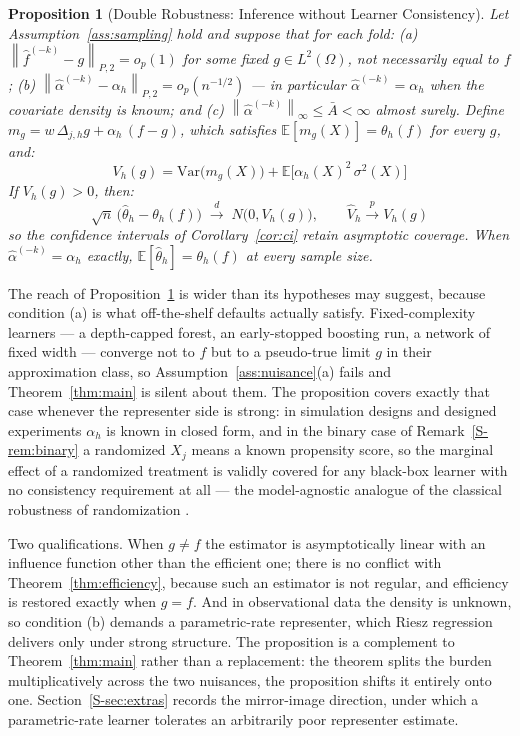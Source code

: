 \documentclass[12pt,a4paper]{article}
\numberwithin{equation}{section}
\theoremstyle{plain}
\newtheorem{proposition}{Proposition}
\theoremstyle{definition}
\newcommand{\norm}[1]{\left\| #1 \right\|}
\newcommand{\E}{\mathbb{E}}
\newcommand{\xrightarrowp}{\xrightarrow{p}}
\newcommand{\Dh}{\Delta_{j,h}}
\newcommand{\Ptwo}[1]{\norm{#1}_{P,2}}
\begin{document}
	\begin{proposition}[Double Robustness: Inference without Learner Consistency]
		\label{prop:robust}
		Let Assumption~\ref{ass:sampling} hold and suppose that for each fold:
		(a) $\Ptwo{\hat{f}^{(-k)} - g} = o_p(1)$ for some fixed $g \in L^2(\Omega)$,
		\emph{not necessarily equal to $f$};
		(b) $\Ptwo{\hat{\alpha}^{(-k)} - \alpha_h} = o_p(n^{-1/2})$ --- in particular
		$\hat{\alpha}^{(-k)} = \alpha_h$ when the covariate density is known; and
		(c) $\norm{\hat{\alpha}^{(-k)}}_\infty \leq \bar{A} < \infty$ almost surely.
		Define $m_g = w\, \Dh g + \alpha_h\,(f - g)$, which satisfies
		$\E[m_g(X)] = \theta_h(f)$ for every $g$, and:
		\begin{equation}
			V_h(g) = \mathrm{Var}\bigl(m_g(X)\bigr)
			+ \E\bigl[\alpha_h(X)^2\, \sigma^2(X)\bigr]
			\label{eq:vrobust}
		\end{equation}
		If $V_h(g) > 0$, then:
		\begin{equation}
			\sqrt{n}\,\bigl(\hat{\theta}_h - \theta_h(f)\bigr)
			\;\xrightarrow{d}\; N\bigl(0, V_h(g)\bigr),
			\qquad
			\hat{V}_h \xrightarrowp V_h(g)
		\end{equation}
		so the confidence intervals of Corollary~\ref{cor:ci} retain asymptotic
		coverage. When $\hat{\alpha}^{(-k)} = \alpha_h$ exactly,
		$\E[\hat{\theta}_h] = \theta_h(f)$ at every sample size.
	\end{proposition}
	
	The reach of Proposition~\ref{prop:robust} is wider than its hypotheses may
	suggest, because condition (a) is what off-the-shelf defaults actually
	satisfy. Fixed-complexity learners --- a depth-capped forest, an early-stopped
	boosting run, a network of fixed width --- converge not to $f$ but to a
	pseudo-true limit $g$ in their approximation class, so
	Assumption~\ref{ass:nuisance}(a) fails and Theorem~\ref{thm:main} is silent
	about them. The proposition covers exactly that case whenever the representer
	side is strong: in simulation designs and designed experiments $\alpha_h$ is
	known in closed form, and in the binary case of Remark~\ref{S-rem:binary} a
	randomized $X_j$ means a known propensity score, so the marginal effect of a
	randomized treatment is validly covered for any black-box learner with no
	consistency requirement at all --- the model-agnostic analogue of the
	classical robustness of randomization \citep{robins1994}.

	Two qualifications. When $g \neq f$ the estimator is asymptotically linear
	with an influence function other than the efficient one; there is no conflict
	with Theorem~\ref{thm:efficiency}, because such an estimator is not regular,
	and efficiency is restored exactly when $g = f$. And in observational data the
	density is unknown, so condition (b) demands a parametric-rate representer,
	which Riesz regression delivers only under strong structure. The proposition
	is a complement to Theorem~\ref{thm:main} rather than a replacement: the
	theorem splits the burden multiplicatively across the two nuisances, the
	proposition shifts it entirely onto one. Section~\ref{S-sec:extras} records
	the mirror-image direction, under which a parametric-rate learner tolerates an
	arbitrarily poor representer estimate.
	
\end{document}
